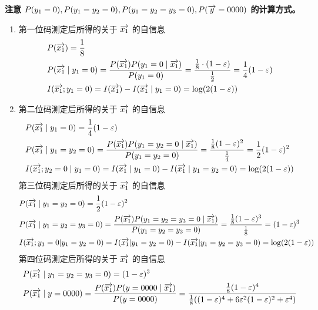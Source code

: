 \begin{remark}
\begin{solution}
        \textbf{注意 $P(y_1 = 0), P(y_1 = y_2 = 0), P(y_1 = y_2 = y_3 = 0), P(\overrightarrow{y} = 0000)$ 的计算方式。}
        \begin{enumerate}
            \item 第一位码测定后所得的关于 $\overrightarrow{x_1}$ 的自信息 
            \begin{align*}
                &P(\overrightarrow{x_1}) = \frac{1}{8}\\
                &P(\overrightarrow{x_1} \mid y_1 = 0) = \frac{P(\overrightarrow{x_1})P(y_1 = 0 \mid \overrightarrow{x_1})}{P(y_1 = 0)} = \frac{\frac{1}{8} \cdot (1 - \varepsilon)}{\frac{1}{2}} = \frac{1}{4}(1 - \varepsilon) \\
                &I(\overrightarrow{x_1}; y_1 = 0) = I(\overrightarrow{x_1}) - I(\overrightarrow{x_1} \mid y_1 = 0) = \log(2(1 - \varepsilon))
            \end{align*}
            \item 第二位码测定后所得的关于 $\overrightarrow{x_1}$ 的自信息
            \begin{align*}
                &P(\overrightarrow{x_1} \mid y_1 = 0) = \frac{1}{4}(1 - \varepsilon) \\
                &P(\overrightarrow{x_1} \mid y_1 = y_2 = 0) = \frac{P(\overrightarrow{x_1}) P(y_1 = y_2 = 0\mid\overrightarrow{x_1})}{P(y_1 = y_2 = 0)} = \frac{\frac{1}{8} (1 - \varepsilon)^2}{\frac{1}{4}} = \frac{1}{2} (1 - \varepsilon)^2\\
                &I(\overrightarrow{x_1}; y_2 = 0 \mid y_1 = 0) = I(\overrightarrow{x_1} \mid y_1 = 0) - I(\overrightarrow{x_1} \mid y_1 = y_2 = 0) = \log(2(1 - \varepsilon))
            \end{align*}
            第三位码测定后所得的关于 $\overrightarrow{x_1}$ 的自信息
            \begin{align*}
                &P(\overrightarrow{x_1} \mid y_1 = y_2 = 0) = \frac{1}{2} (1 - \varepsilon)^2\\
                &P(\overrightarrow{x_1} \mid y_1 = y_2 = y_3 = 0) = \frac{P(\overrightarrow{x_1})P(y_1 = y_2 = y_3 = 0 \mid \overrightarrow{x_1})}{P(y_1 = y_2 = y_3 = 0)} = \frac{\frac{1}{8} (1 - \varepsilon)^3}{\frac{1}{8}} = (1 - \varepsilon)^3\\
                &I(\overrightarrow{x_1}; y_3 = 0 | y_1 = y_2 = 0) = I(\overrightarrow{x_1} | y_1 = y_2 = 0) - I(\overrightarrow{x_1} | y_1 = y_2 = y_3 = 0) = \log(2(1 - \varepsilon))
            \end{align*}
            第四位码测定后所得的关于 $\overrightarrow{x_1}$ 的自信息
            \begin{align*}
                &P(\vc{x_1} \mid y_1 = y_2 = y_3 = 0) = (1 - \varepsilon)^3\\
                &P(\vc{x_1} \mid y = 0000) = \frac{P(\vc{x_1}) P(y = 0000 \mid \vc{x_1})}{P(y = 0000)} = \frac{\frac{1}{8} (1 - \varepsilon)^4}{\frac{1}{8}((1 - \varepsilon)^4 + 6\varepsilon^2 (1 - \varepsilon)^2 + \varepsilon^4)}\\

\end{align*}
\end{enumerate}
\end{solution}
\end{remark}

